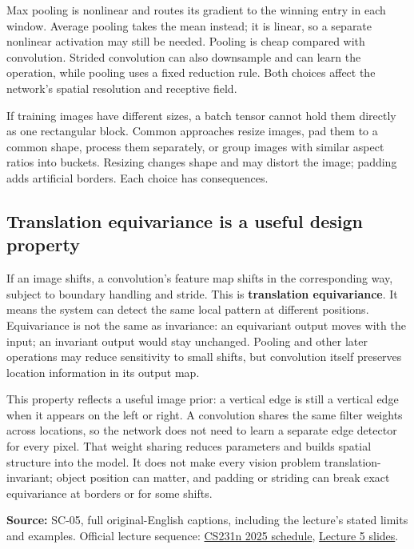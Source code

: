 Max pooling is nonlinear and routes its gradient to the winning entry in each window. Average pooling takes the mean instead; it is linear, so a separate nonlinear activation may still be needed. Pooling is cheap compared with convolution. Strided convolution can also downsample and can learn the operation, while pooling uses a fixed reduction rule. Both choices affect the network's spatial resolution and receptive field.

If training images have different sizes, a batch tensor cannot hold them directly as one rectangular block. Common approaches resize images, pad them to a common shape, process them separately, or group images with similar aspect ratios into buckets. Resizing changes shape and may distort the image; padding adds artificial borders. Each choice has consequences.

\subsection{Translation equivariance is a useful design property}\label{04-visual-computing-ii-ch031-translation-equivariance-is-a-useful-design-property}

\hypertarget{04-visual-computing-ii-ch031-translation-equivariance-is-a-useful-design-property}{}

If an image shifts, a convolution's feature map shifts in the corresponding way, subject to boundary handling and stride. This is \textbf{translation equivariance}. It means the system can detect the same local pattern at different positions. Equivariance is not the same as invariance: an equivariant output moves with the input; an invariant output would stay unchanged. Pooling and other later operations may reduce sensitivity to small shifts, but convolution itself preserves location information in its output map.

This property reflects a useful image prior: a vertical edge is still a vertical edge when it appears on the left or right. A convolution shares the same filter weights across locations, so the network does not need to learn a separate edge detector for every pixel. That weight sharing reduces parameters and builds spatial structure into the model. It does not make every vision problem translation-invariant; object position can matter, and padding or striding can break exact equivariance at borders or for some shifts.

\textbf{Source:} SC-05, full original-English captions, including the lecture's stated limits and examples. Official lecture sequence: \href{https://cs231n.stanford.edu/2025/schedule.html}{CS231n 2025 schedule}, \href{https://cs231n.stanford.edu/slides/2025/lecture_5.pdf}{Lecture 5 slides}.

